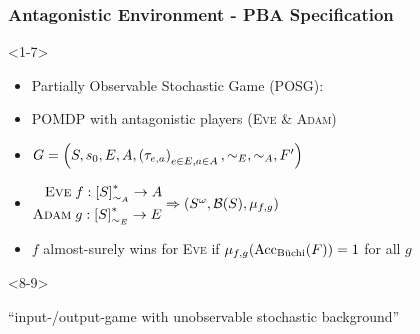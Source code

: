 \documentclass{beamer}
\newcommand{\adam}{\textsc{Adam}}
\newcommand{\eve}{\textsc{Eve}}
\begin{document}
  \begin{frame}
    \frametitle{Antagonistic Environment - \ac{PBA} Specification}
    \begin{onlyenv}<1-7>
      \begin{itemize}
        \item<2-> Partially Observable Stochastic Game (\ac{POSG}):
        \item<3-> \ac{POMDP} with antagonistic players (\eve{} \& \adam{})
        \item<4-> $G = \left(S, s_{0}, E, A,
          \left(\tau_{e,a}\right)_{e\in E, a\in A}, \sim_{E}, \sim_{A}, F'\right)$
        \item<5-> 
          $\begin{aligned}
            \eve{}\; &f:\interval{S}_{\sim_{A}}^{*}\rightarrow A\\
            \adam{}\; &g:\interval{S}_{\sim_{E}}^{*}\rightarrow E
          \end{aligned} \Rightarrow \tuple{S^{\omega}, \mathcal{B}(S), 
          \mu_{f,g}}$
        \item<6-> $f$ almost-surely wins for \eve{} if
          $\mu_{f,g}(\operatorname{Acc}_{\operatorname{B\ddot{u}chi}}(F)) = 1$ for all $g$
      \end{itemize}
    \end{onlyenv}
    \begin{onlyenv}<8-9>
      \begin{center}
        \enquote{input-/output-game with unobservable stochastic background}
      \end{center}

\end{onlyenv}
\end{frame}
\end{document}
